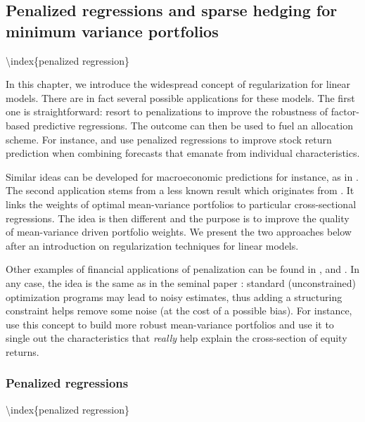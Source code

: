 \subsection{Penalized regressions and sparse hedging for minimum variance portfolios}


{\textbackslash}index\{penalized regression\}

In this chapter, we introduce the widespread concept of regularization for linear models. There are in fact several possible applications for these models. The first one is straightforward: resort to penalizations to improve the robustness of factor-based predictive regressions. The outcome can then be used to fuel an allocation scheme. For instance, \cite{han2018firm} and \cite{rapach2019time} use penalized regressions to improve stock return prediction when combining forecasts that emanate from individual characteristics.

Similar ideas can be developed for macroeconomic predictions for instance, as in \cite{uematsu2019high}.
The second application stems from a less known result which originates from \cite{stevens1998inverse}. It links the weights of optimal mean-variance portfolios to particular cross-sectional regressions. The idea is then different and the purpose is to improve the quality of mean-variance driven portfolio weights. We present the two approaches below after an introduction on regularization techniques for linear models.

Other examples of financial applications of penalization can be found in \cite{d2011identifying}, \cite{ban2016machine} and \cite{kremer2019sparse}. In any case, the idea is the same as in the seminal paper \cite{tibshirani1996regression}: standard (unconstrained) optimization programs may lead to noisy estimates, thus adding a structuring constraint helps remove some noise (at the cost of a possible bias). For instance, \cite{kremer2019sparse} use this concept to build more robust mean-variance \citep{markowitz1952portfolio} portfolios and \cite{freyberger2020dissecting} use it to single out the characteristics that \textit{really} help explain the cross-section of equity returns.

\subsubsection{Penalized regressions}

{\textbackslash}index\{penalized regression\}

